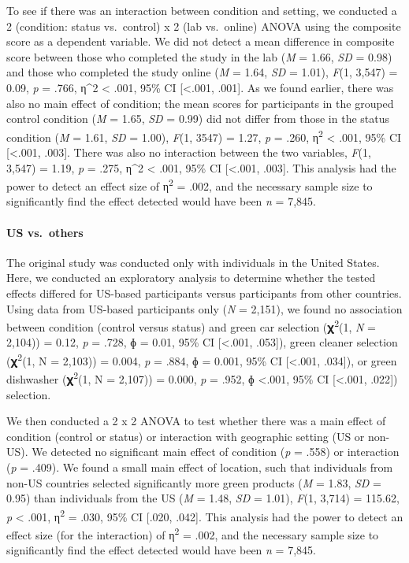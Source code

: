 \documentclass[
]{article}
\begin{document}
To see if there was an interaction between condition and setting, we
conducted a 2 (condition: status vs.~control) x 2 (lab vs.~online) ANOVA
using the composite score as a dependent variable. We did not detect a
mean difference in composite score between those who completed the study
in the lab (\emph{M} = 1.66, \emph{SD} = 0.98) and those who completed
the study online (\emph{M} = 1.64, \emph{SD} = 1.01), \emph{F}(1, 3,547)
= 0.09, \emph{p} = .766, η\^{}2 \textless{} .001, 95\% CI
{[}\textless.001, .001{]}. As we found earlier, there was also no main
effect of condition; the mean scores for participants in the grouped
control condition (\emph{M} = 1.65, \emph{SD} = 0.99) did not differ
from those in the status condition (\emph{M} = 1.61, \emph{SD} = 1.00),
\emph{F}(1, 3547) = 1.27, \emph{p} = .260, η\textsuperscript{2}
\textless{} .001, 95\% CI {[}\textless.001, .003{]}. There was also no
interaction between the two variables, \emph{F}(1, 3,547) = 1.19,
\emph{p} = .275, η\^{}2 \textless{} .001, 95\% CI {[}\textless.001,
.003{]}. This analysis had the power to detect an effect size of
η\textsuperscript{2} = .002, and the necessary sample size to
significantly find the effect detected would have been \emph{n} = 7,845.

\paragraph{US vs.~others}\label{us-vs.-others}

The original study was conducted only with individuals in the United
States. Here, we conducted an exploratory analysis to determine whether
the tested effects differed for US-based participants versus
participants from other countries. Using data from US-based participants
only (\emph{N} = 2,151), we found no association between condition
(control versus status) and green car selection (𝛘\textsuperscript{2}(1,
\emph{N} = 2,104)) = 0.12, \emph{p} = .728, ɸ = 0.01, 95\% CI
{[}\textless.001, .053{]}), green cleaner selection
(𝛘\textsuperscript{2}(1, N = 2,103)) = 0.004, \emph{p} = .884, ɸ =
0.001, 95\% CI {[}\textless.001, .034{]}), or green dishwasher
(𝛘\textsuperscript{2}(1, N = 2,107)) = 0.000, \emph{p} = .952, ɸ
\textless.001, 95\% CI {[}\textless.001, .022{]}) selection.

We then conducted a 2 x 2 ANOVA to test whether there was a main effect
of condition (control or status) or interaction with geographic setting
(US or non-US). We detected no significant main effect of condition
(\emph{p} = .558) or interaction (\emph{p} = .409). We found a small
main effect of location, such that individuals from non-US countries
selected significantly more green products (\emph{M} = 1.83, \emph{SD} =
0.95) than individuals from the US (\emph{M} = 1.48, \emph{SD} = 1.01),
\emph{F}(1, 3,714) = 115.62, \emph{p} \textless{} .001,
η\textsuperscript{2} = .030, 95\% CI {[}.020, .042{]}. This analysis had
the power to detect an effect size (for the interaction) of
η\textsuperscript{2} = .002, and the necessary sample size to
significantly find the effect detected would have been \emph{n} = 7,845.
\end{document}
